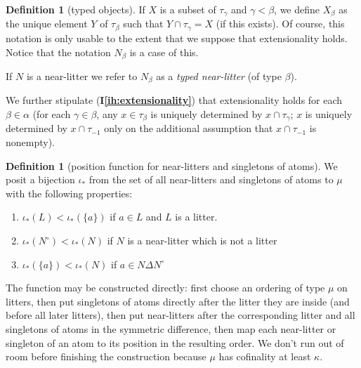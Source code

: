 \documentclass[112pt]{article}
\theoremstyle{definition}
\newtheorem{definition}[theorem]{Definition}
\theoremstyle{remark}
\newcommand{\ihref}[1]{(\textbf{I\ref{#1}})}
\newcommand{\rk}[1]{{\color{blue}\sl #1}}
\newenvironment{annot}{\begin{center}\color{blue}\sl}{\end{center}}
\begin{document}
\begin{definition}[typed objects]\label{def:typed_objects}
If $X$ is a subset of $\tau_\gamma$ and $\gamma<\beta$, we define $X_\beta$ as the unique element $Y$ of $\tau_\beta$
such that $Y \cap \tau_\gamma = X$ (if this exists).  Of course, this notation is only usable to the extent that we suppose that extensionality holds.  Notice
that the notation $N_\beta$ is a case of this.

If $N$ is a near-litter we refer to $N_\beta$ as a {\em typed near-litter\/} (of type $\beta$).
\end{definition}

We further stipulate \ihref{ih:extensionality} that extensionality holds for each $\beta\in \alpha$ (for each $\gamma\in \beta$, any $x \in \tau_\beta$ is uniquely determined by $x \cap \tau_\gamma$;  $x$ is uniquely determined by $x \cap \tau_{-1}$ only on the additional assumption that $x \cap \tau_{-1}$ is nonempty).

\begin{comment}
\begin{annot}
It is interesting to note that the Lean formalisation does not use \ihref{ih:extensionality} until the counting argument; in particular, it is not needed to construct $\tau_\alpha$ at stage $\alpha$.
\end{annot}
\end{comment}

\begin{definition}[position function for near-litters and {singletons of} atoms]\label{def:pos_atom_near_litter}
We posit a bijection %
$\iota_*$ from the set of all near-litters and {singletons of} atoms to $\mu$ with the following properties:

\begin{enumerate}

\item $\iota_*(L) < \iota_*(\{a\})$ if $a \in L$ and $L$ is a litter.

\item  $\iota_*(N^\circ)<\iota_*(N)$ if $N$ is a near-litter which is not a litter

\item $\iota_*(\{a\}) < \iota_*(N)$ if $a \in N \Delta N^\circ$

\end{enumerate}

\end{definition}

The function may be constructed directly: first choose an ordering of type $\mu$ on litters, then put {singletons of} atoms directly after the litter they are inside (and before all later litters), then put near-litters after the corresponding litter and all {singletons of} atoms in the symmetric difference, then map each near-litter or {singleton of an} atom to its position in the resulting order.
We don't run out of room before finishing the construction because $\mu$ has cofinality at least $\kappa$.
\end{document}
